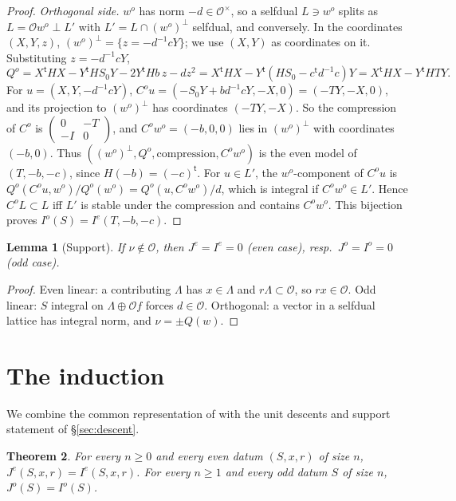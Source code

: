 \documentclass[11pt,oneside,notitlepage]{book}
\numberwithin{equation}{section}
\theoremstyle{plain}
\newtheorem{theorem}{Theorem}[section]
\newtheorem{lemma}[theorem]{Lemma}
\theoremstyle{definition}
\newcommand{\cO}{\mathcal{O}}
\begin{document}
\begin{proof}
\emph{Orthogonal side.} $w^o$ has norm $-d\in\cO^\times$, so a selfdual $L\ni w^o$ splits as $L=\cO w^o\perp L'$ with $L'=L\cap(w^o)^\perp$ selfdual, and conversely. In the coordinates $(X,Y,z)$, $(w^o)^\perp=\{z=-d^{-1}cY\}$; we use $(X,Y)$ as coordinates on it. Substituting $z=-d^{-1}cY$,
\[Q^o=X^{\mathsf t}HX-Y^{\mathsf t}HS_0Y-2Y^{\mathsf t}Hb\,z-dz^2=X^{\mathsf t}HX-Y^{\mathsf t}(HS_0-c^{\mathsf t}d^{-1}c)Y=X^{\mathsf t}HX-Y^{\mathsf t}HTY.\]
For $u=(X,Y,-d^{-1}cY)$, $C^ou=(-S_0Y+bd^{-1}cY,-X,0)=(-TY,-X,0)$, and its projection to $(w^o)^\perp$ has coordinates $(-TY,-X)$. So the compression of $C^o$ is $\left(\begin{smallmatrix}0&-T\\-I&0\end{smallmatrix}\right)$, and $C^ow^o=(-b,0,0)$ lies in $(w^o)^\perp$ with coordinates $(-b,0)$. Thus $((w^o)^\perp,Q^o,\text{compression},C^ow^o)$ is the even model of $(T,-b,-c)$, since $H(-b)=(-c)^{\mathsf t}$. For $u\in L'$, the $w^o$-component of $C^ou$ is $Q^o(C^ou,w^o)/Q^o(w^o)=Q^o(u,C^ow^o)/d$, which is integral if $C^ow^o\in L'$. Hence $C^oL\subset L$ iff $L'$ is stable under the compression and contains $C^ow^o$. This bijection proves $I^o(S)=I^e(T,-b,-c)$.
\end{proof}

\begin{lemma}[Support]\label{lem:support}
If $\nu\notin\cO$, then $J^e=I^e=0$ (even case), resp.\ $J^o=I^o=0$ (odd case).
\end{lemma}
\begin{proof}
Even linear: a contributing $\Lambda$ has $x\in\Lambda$ and $r\Lambda\subset\cO$, so $rx\in\cO$. Odd linear: $S$ integral on $\Lambda\oplus\cO f$ forces $d\in\cO$. Orthogonal: a vector in a selfdual lattice has integral norm, and $\nu=\pm Q(w)$.
\end{proof}

\section{The induction}\label{sec:induction}

We combine the common representation of  with the unit descents and support statement of \S\ref{sec:descent}.

\begin{theorem}\label{thm:LieFL}
For every $n\ge0$ and every even datum $(S,x,r)$ of size $n$, $J^e(S,x,r)=I^e(S,x,r)$. For every $n\ge1$ and every odd datum $S$ of size $n$, $J^o(S)=I^o(S)$.
\end{theorem}
\end{document}
